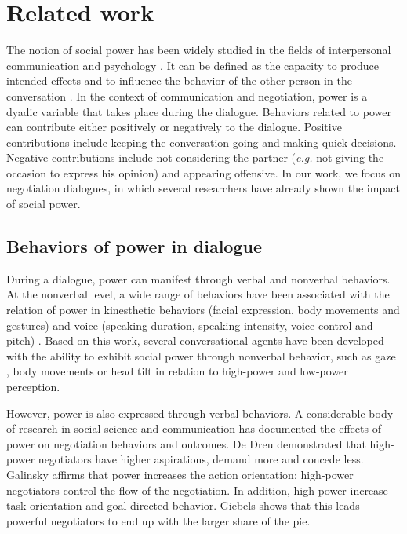 \documentclass{llncs}
\begin{document}
		\section{Related work}
		The notion of social power has been widely studied in the fields of interpersonal communication and psychology \cite{kecskes2013research}. It can be defined as the capacity to produce intended effects and to influence the behavior of the other person in the conversation \cite{dunbar2005perceptions}. In the context of communication and negotiation, power is a dyadic variable that takes place during the dialogue.
		Behaviors related to power can contribute either positively or negatively to the dialogue. Positive contributions include keeping the conversation going and making quick decisions. Negative contributions include not considering the partner (\emph{e.g.} not giving the occasion to express his opinion) and appearing offensive. In our work, we focus on negotiation dialogues, in which several researchers have already shown the impact of social power\cite{de2004influence,burgoonnonverbal}.

		\subsection{Behaviors of power in dialogue}
		\label{sec:domDialogue}
		During a dialogue, power can manifest through verbal and nonverbal behaviors.	
		At the nonverbal level, a wide range of behaviors have been associated with the relation of power in kinesthetic behaviors (facial expression, body movements and gestures) and voice (speaking duration, speaking intensity, voice control and pitch) \cite{burgoonnonverbal}. Based on this work, several conversational agents have been developed with the ability to exhibit social power through nonverbal behavior, such as gaze \cite{lance2008relation}, body movements \cite{mignault2003many} or head tilt \cite{gebhard2014exploring}
		in relation to high-power and low-power perception.
		
		However, power is also expressed through verbal behaviors. A considerable body of research in social science and communication has documented the effects of power on negotiation behaviors and outcomes. De Dreu \cite{de1995impact} demonstrated that high-power negotiators have higher aspirations, demand more and concede less. Galinsky \cite{galinsky2003power} affirms that power increases the action orientation: high-power negotiators control the flow of the negotiation. In addition, high power increase task orientation and goal-directed behavior. Giebels \cite{giebels2000interdependence} shows that this leads powerful negotiators to end up with the larger share of the pie.
		
\end{document}
